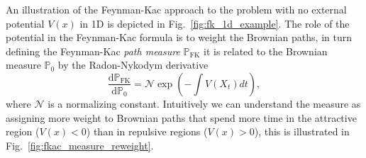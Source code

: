 An illustration of the Feynman-Kac approach to the problem with no external potential $V(x)$ in 1D is depicted in Fig.~\ref{fig:fk_1d_example}. The role of the potential in the Feynman-Kac formula is to weight the Brownian paths, in turn defining the Feynman-Kac \emph{path measure} $\mathbb{P}_{\mathrm{FK}}$ it is related to the Brownian measure $\mathbb{P}_{0}$ by the Radon-Nykodym derivative
\begin{equation}
\label{eq:RNderiv}
\frac{\mathrm{d} \mathbb{P}_{\mathrm{FK}}}{\mathrm{d} \mathbb{P}_{0}}=\mathcal{N} \exp \left(-\int V\left(X_{t}\right) d t\right),
\end{equation}
where $\mathcal{N}$ is a normalizing constant. Intuitively we can understand the measure as assigning more weight to Brownian paths that spend more time in the attractive region ($V(x) < 0$) than in repulsive regions ($V(x) > 0$), this is illustrated in Fig.~\ref{fig:fkac_measure_reweight}.
